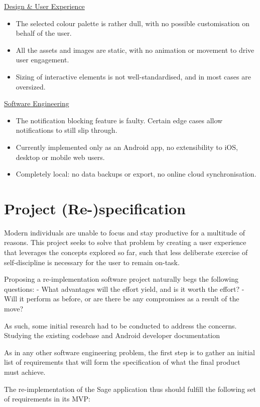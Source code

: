 \underline{Design \& User Experience}
\begin{itemize}
    \item The selected colour palette is rather dull, with no possible customisation on behalf of the user.
    \item All the assets and images are static, with no animation or movement to drive user engagement.
    \item Sizing of interactive elements is not well-standardised, and in most cases are oversized.
\end{itemize}

\underline{Software Engineering}
\begin{itemize}
    \item The notification blocking feature is faulty. Certain edge cases allow notifications to still slip through.
    \item Currently implemented only as an Android app, no extensibility to iOS, desktop or mobile web users.
    \item Completely local: no data backups or export, no online cloud synchronisation.
\end{itemize}


\section{Project (Re-)specification}
Modern individuals are unable to focus and stay productive for a multitude of reasons. This project seeks to solve that problem by creating a user experience that leverages the concepts explored so far, such that less deliberate exercise of self-discipline is necessary for the user to remain on-task.

Proposing a re-implementation software project naturally begs the following questions:
- What advantages will the effort yield, and is it worth the effort?
- Will it perform as before, or are there be any compromises as a result of the move?

As such, some initial research had to be conducted to address the concerns.
Studying the existing codebase and Android developer documentation

As in any other software engineering problem, the first step is to gather an initial list of requirements that will form the specification of what the final product must achieve.

The re-implementation of the Sage application thus should fulfill the following set of requirements in its MVP:

